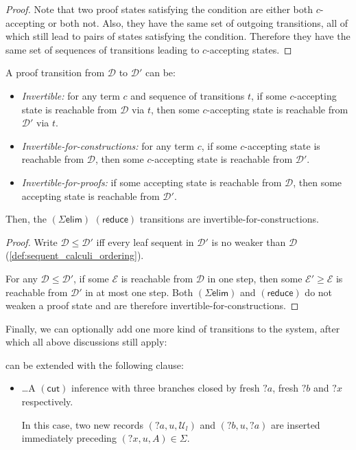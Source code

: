 \documentclass[twoside]{report}
\begin{document}
\begin{proof}
Note that two proof states satisfying the condition are either both $c$-accepting or both not. Also, they have the same set of outgoing transitions, all of which still lead to pairs of states satisfying the condition. Therefore they have the same set of sequences of transitions leading to $c$-accepting states.
\end{proof}

\begin{proposition}
\label{thm:tableau_transitions_invertibility}
A proof transition from $\mathcal D$ to $\mathcal D'$ can be:
\begin{itemize}
    \item \emph{Invertible:} for any term $c$ and sequence of transitions $t$, if some $c$-accepting state is reachable from $\mathcal D$ via $t$, then some $c$-accepting state is reachable from $\mathcal D'$ via $t$.

    \item \emph{Invertible-for-constructions:} for any term $c$, if some $c$-accepting state is reachable from $\mathcal D$, then some $c$-accepting state is reachable from $\mathcal D'$.

    \item \emph{Invertible-for-proofs:} if some accepting state is reachable from $\mathcal D$, then some accepting state is reachable from $\mathcal D'$.
\end{itemize}
Then, the $(\Sigma\mathsf{elim})$ $(\mathsf{reduce})$ transitions are invertible-for-constructions.
\end{proposition}

\begin{proof}
Write $\mathcal D \leq \mathcal D'$ iff every leaf sequent in $\mathcal D'$ is no weaker than $\mathcal D$ (\cref{def:sequent_calculi_ordering}).

For any $\mathcal D \leq \mathcal D'$, if some $\mathcal E$ is reachable from $\mathcal D$ in one step, then some $\mathcal E' \geq \mathcal E$ is reachable from $\mathcal D'$ in at most one step. Both $(\Sigma\mathsf{elim})$ and $(\mathsf{reduce})$ do not weaken a proof state and are therefore invertible-for-constructions.
\end{proof}

Finally, we can optionally add one more kind of transitions to the system, after which all above discussions still apply:

\begin{definition}
\label{def:tableau_transitions_with_cut}
 can be extended with the following clause:
\begin{itemize}
    \item \ldots A $(\mathsf{cut})$ inference with three branches closed by fresh ${?a}$, fresh ${?b}$ and ${?x}$ respectively.\par
    In this case, two new records $({?a}, u, \mathcal U_l)$ and $({?b}, u, {?a})$ are inserted immediately preceding $({?x}, u, A) \in \Sigma$.
\end{itemize}
\end{definition}
\end{document}
